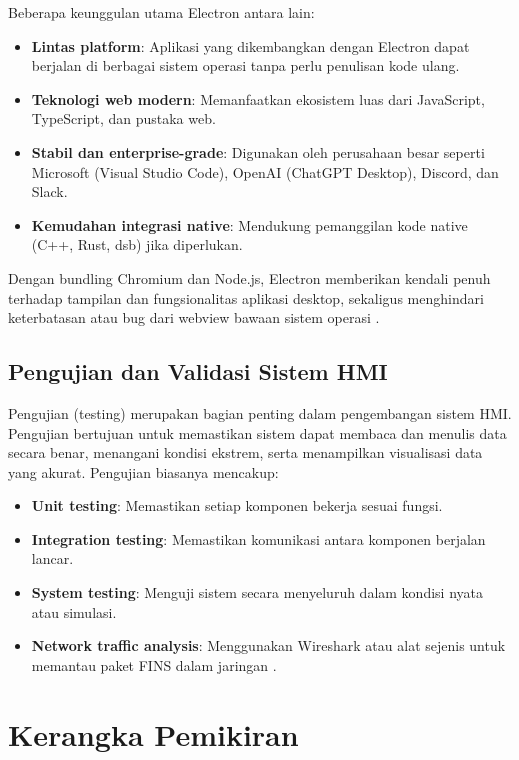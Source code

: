 Beberapa keunggulan utama Electron antara lain:

\begin{itemize}
    \item \textbf{Lintas platform}: Aplikasi yang dikembangkan dengan Electron dapat berjalan di berbagai sistem operasi tanpa perlu penulisan kode ulang.
    \item \textbf{Teknologi web modern}: Memanfaatkan ekosistem luas dari JavaScript, TypeScript, dan pustaka web.
    \item \textbf{Stabil dan enterprise-grade}: Digunakan oleh perusahaan besar seperti Microsoft (Visual Studio Code), OpenAI (ChatGPT Desktop), Discord, dan Slack.
    \item \textbf{Kemudahan integrasi native}: Mendukung pemanggilan kode native (C++, Rust, dsb) jika diperlukan.
\end{itemize}

Dengan bundling Chromium dan Node.js, Electron memberikan kendali penuh terhadap tampilan dan fungsionalitas aplikasi desktop, sekaligus menghindari keterbatasan atau bug dari webview bawaan sistem operasi \parencite{electron2024why}.

\subsection{Pengujian dan Validasi Sistem HMI}
Pengujian (testing) merupakan bagian penting dalam pengembangan sistem HMI. Pengujian bertujuan untuk memastikan sistem dapat membaca dan menulis data secara benar, menangani kondisi ekstrem, serta menampilkan visualisasi data yang akurat. Pengujian biasanya mencakup:

\begin{itemize}
    \item \textbf{Unit testing}: Memastikan setiap komponen bekerja sesuai fungsi.
    \item \textbf{Integration testing}: Memastikan komunikasi antara komponen berjalan lancar.
    \item \textbf{System testing}: Menguji sistem secara menyeluruh dalam kondisi nyata atau simulasi.
    \item \textbf{Network traffic analysis}: Menggunakan Wireshark atau alat sejenis untuk memantau paket FINS dalam jaringan \parencite{almas2014open}.
\end{itemize}

\section{Kerangka Pemikiran}

